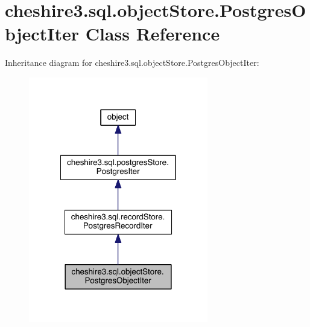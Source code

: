 \hypertarget{classcheshire3_1_1sql_1_1object_store_1_1_postgres_object_iter}{\section{cheshire3.\-sql.\-object\-Store.\-Postgres\-Object\-Iter Class Reference}
\label{classcheshire3_1_1sql_1_1object_store_1_1_postgres_object_iter}
}


Inheritance diagram for cheshire3.\-sql.\-object\-Store.\-Postgres\-Object\-Iter\-:
\nopagebreak
\begin{figure}[H]
\begin{center}
\leavevmode
\includegraphics[width=222pt]{classcheshire3_1_1sql_1_1object_store_1_1_postgres_object_iter__inherit__graph}
\end{center}
\end{figure}


